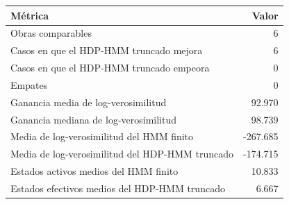 \begin{tabular}{lr}
\hline
Métrica & Valor \\
\hline
Obras comparables & 6 \\
Casos en que el HDP-HMM truncado mejora & 6 \\
Casos en que el HDP-HMM truncado empeora & 0 \\
Empates & 0 \\
Ganancia media de log-verosimilitud & 92.970 \\
Ganancia mediana de log-verosimilitud & 98.739 \\
Media de log-verosimilitud del HMM finito & -267.685 \\
Media de log-verosimilitud del HDP-HMM truncado & -174.715 \\
Estados activos medios del HMM finito & 10.833 \\
Estados efectivos medios del HDP-HMM truncado & 6.667 \\
\hline
\end{tabular}
